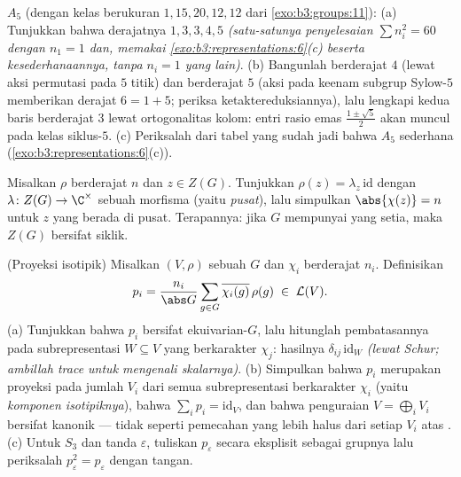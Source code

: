 \begin{exercise}[$\star\star\star$]\label{exo:b3:representations:9}
 $A_5$ (dengan kelas berukuran $1, 15, 20, 12,
12$ dari \cref{exo:b3:groups:11}):
(a) Tunjukkan bahwa derajatnya $1, 3, 3, 4, 5$ \emph{(satu-satunya
penyelesaian $\sum n_i^2 = 60$ dengan $n_1 = 1$ dan, memakai
\cref{exo:b3:representations:6}(c) beserta kesederhanaannya, tanpa
$n_i = 1$ yang lain)}.
(b) Bangunlah  berderajat $4$ (lewat aksi permutasi pada
$5$ titik) dan  berderajat $5$ (aksi pada keenam
subgrup Sylow-$5$ memberikan derajat $6 = 1 + 5$; periksa
ketaktereduksiannya), lalu lengkapi kedua baris berderajat $3$ lewat ortogonalitas
kolom: entri rasio emas $\frac{1\pm\sqrt5}2$ akan muncul
pada kelas siklus-$5$.
(c) Periksalah dari tabel yang sudah jadi bahwa $A_5$ sederhana
(\cref{exo:b3:representations:6}(c)).
\end{exercise}

\begin{exercise}[$\star\star$]\label{exo:b3:representations:10}
Misalkan $\rho$  berderajat $n$ dan $z
\in Z(G)$. Tunjukkan $\rho(z) = \lambda_z\,\mathrm{id}$ dengan
$\lambda \colon Z(G) \to \C^\times$ sebuah morfisma (yaitu
\emph{ pusat}), lalu simpulkan $\abs{\chi(z)} = n$ untuk
$z$ yang berada di pusat. Terapannya: jika $G$ mempunyai 
yang setia, maka $Z(G)$ bersifat siklik.
\end{exercise}

\begin{exercise}[$\star\star$]\label{exo:b3:representations:11}
(Proyeksi isotipik) Misalkan $(V, \rho)$ sebuah 
$G$ dan $\chi_i$   berderajat $n_i$.
Definisikan
\[
p_i = \frac{n_i}{\abs G}\sum_{g\in G}
\overline{\chi_i(g)}\,\rho(g) \;\in\; \mathcal L(V).
\]
(a) Tunjukkan bahwa $p_i$ bersifat ekuivarian-$G$, lalu hitunglah
pembatasannya pada subrepresentasi  $W \subseteq
V$ yang berkarakter $\chi_j$: hasilnya $\delta_{ij}\,
\mathrm{id}_W$ \emph{(lewat Schur; ambillah trace untuk mengenali
skalarnya)}.
(b) Simpulkan bahwa $p_i$ merupakan proyeksi pada jumlah $V_i$ dari
semua subrepresentasi  berkarakter $\chi_i$ (yaitu
\emph{komponen isotipiknya}), bahwa $\sum_ip_i =
\mathrm{id}_V$, dan bahwa penguraian $V =
\bigoplus_iV_i$ bersifat kanonik --- tidak seperti pemecahan yang lebih halus
dari setiap $V_i$ atas .
(c) Untuk  $S_3$ dan  tanda
$\varepsilon$, tuliskan $p_\varepsilon$ secara eksplisit
sebagai  grupnya lalu periksalah $p_\varepsilon^2
= p_\varepsilon$ dengan tangan.
\end{exercise}

